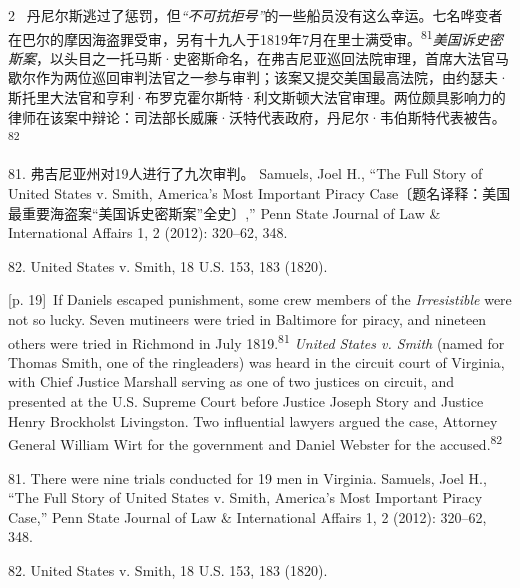 \documentclass[10pt,a4paper]{article}
\begin{document}
\begin{paracol}{2}
\switchcolumn*
{\scriptsize\color{gray} [p. 19]}\ 丹尼尔斯逃过了惩罚，但\textit{“不可抗拒号”}的一些船员没有这么幸运。七名哗变者在巴尔的摩因海盗罪受审，另有十九人于1819年7月在里士满受\mbox{审。\textsuperscript{81}}\textit{美国诉史密斯案}，以头目之一托马斯·史密斯命名，在弗吉尼亚巡回法院审理，首席大法官马歇尔作为两位巡回审判法官之一参与审判；该案又提交美国最高法院，由约瑟夫·斯托里大法官和亨利·布罗克霍尔斯特·利文斯顿大法官审理。两位颇具影响力的律师在该案中辩论：司法部长威廉·沃特代表政府，丹尼尔·韦伯斯特代表被\mbox{告。\textsuperscript{82}}\par{\small 81. 弗吉尼亚州对19人进行了九次审判。 Samuels, Joel H., “The Full Story of United States v. Smith, America’s Most Important Piracy Case〔题名译释：美国最重要海盗案“美国诉史密斯案”全史〕,” Penn State Journal of Law \& International Affairs 1, 2 (2012): 320–62, 348.\par}{\small 82. United States v. Smith, 18 U.S. 153, 183 (1820).\par}
\switchcolumn
{\scriptsize\color{gray} [p. 19]}\ If Daniels escaped punishment, some crew members of the \textit{Irresistible} were not so lucky. Seven mutineers were tried in Baltimore for piracy, and nineteen others were tried in Richmond in July 1819.\nobreak\textsuperscript{81} \textit{United States v. Smith} (named for Thomas Smith, one of the ringleaders) was heard in the circuit court of Virginia, with Chief Justice Marshall serving as one of two justices on circuit, and presented at the U.S. Supreme Court before Justice Joseph Story and Justice Henry Brockholst Livingston. Two influential lawyers argued the case, Attorney General William Wirt for the government and Daniel Webster for the accused.\nobreak\textsuperscript{82}\par{\small 81. There were nine trials conducted for 19 men in Virginia. Samuels, Joel H., “The Full Story of United States v. Smith, America’s Most Important Piracy Case,” Penn State Journal of Law \& International Affairs 1, 2 (2012): 320–62, 348.\par}{\small 82. United States v. Smith, 18 U.S. 153, 183 (1820).\par}
\switchcolumn*

\end{paracol}
\end{document}
